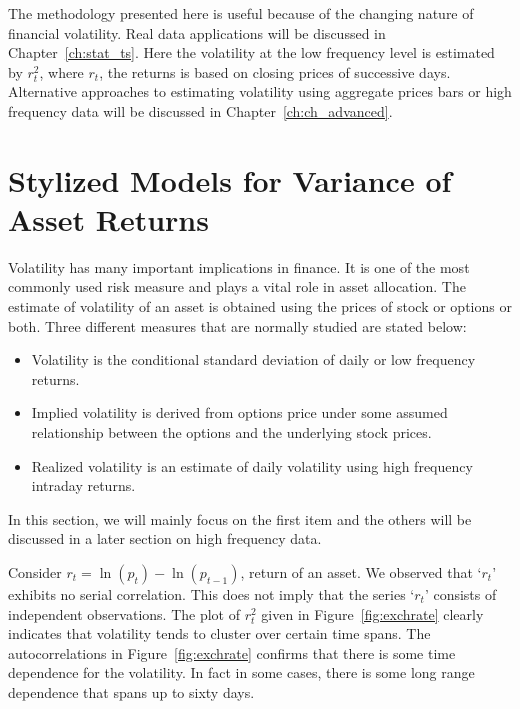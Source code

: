 The methodology presented here is useful because of the changing nature of financial volatility. Real data applications will be discussed in Chapter~\ref{ch:stat_ts}. Here the volatility at the low frequency level is estimated by $r_t^2$, where $r_t$, the returns is based on closing prices of successive days. Alternative approaches to estimating volatility using aggregate prices bars or high frequency data will be discussed in Chapter~\ref{ch:ch_advanced}. 



\section{Stylized Models for Variance of Asset Returns \label{sec:sty_mod_var}} \label{in:assetvol1} \label{in:style3}

Volatility has many important implications in finance. It is one of the most commonly used risk measure and plays a vital role in asset allocation. The estimate of volatility of an asset is obtained using the prices of stock or options or both. Three different measures that are normally studied are stated below:


\begin{itemize}
\item Volatility is the conditional standard deviation of daily or low frequency returns.
\item Implied volatility is derived from options price under some assumed relationship between the options and the underlying stock prices.
\item Realized volatility is an estimate of daily volatility using high frequency intraday returns.
\end{itemize}


In this section, we will mainly focus on the first item and the others will be discussed in a later section on high frequency data.


Consider $r_t = \ln{(p_t) - \ln{(p_{t-1})}}$, return of an asset. We observed that `$r_t$' exhibits no serial correlation. This does not imply that the series `$r_t$' consists of independent observations. The plot of $r_t^2$ given in Figure~\ref{fig:exchrate} clearly indicates that volatility tends to cluster over certain time spans. The autocorrelations in Figure~\ref{fig:exchrate} confirms that there is some time dependence for the volatility. In fact in some cases, there is some long range dependence that spans up to sixty days. \twomedskip


